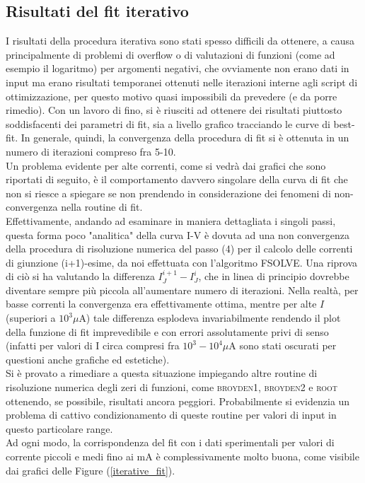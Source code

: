 \documentclass[10pt,letterpaper]{article}
\begin{document}
\subsection{Risultati del fit iterativo}
I risultati della procedura iterativa sono stati spesso difficili da ottenere, a causa principalmente di problemi di overflow o di valutazioni di funzioni (come ad esempio il logaritmo) per argomenti negativi, che ovviamente non erano dati in input ma erano risultati temporanei ottenuti nelle iterazioni interne agli script di ottimizzazione, per questo motivo quasi impossibili da prevedere (e da porre rimedio). Con un lavoro di fino, si è riusciti ad ottenere dei risultati piuttosto soddisfacenti dei parametri di fit, sia a livello grafico tracciando le curve di best-fit. In generale, quindi, la convergenza della procedura di fit si è ottenuta in un numero di iterazioni compreso fra 5-10.\\
Un problema evidente per alte correnti, come si vedrà dai grafici che sono riportati di seguito, è il comportamento davvero singolare della curva di fit che non si riesce a spiegare se non prendendo in considerazione dei fenomeni di non-convergenza nella routine di fit. \\
Effettivamente, andando ad esaminare in maniera dettagliata i singoli passi, questa forma poco "analitica" della curva I-V è dovuta ad una non convergenza della procedura di risoluzione numerica del passo (4) per il calcolo delle correnti di giunzione (i+1)-esime, da noi effettuata con l'algoritmo \textsc{FSOLVE}. Una riprova di ciò si ha valutando la differenza $I_{J}^{i+1} - I_{J}^{i}$, che in linea di principio dovrebbe diventare sempre più piccola all'aumentare numero di iterazioni. Nella realtà, per basse correnti la convergenza era effettivamente ottima, mentre per alte $I$ (superiori a $10^3 \mu$A) tale differenza esplodeva invariabilmente rendendo il plot della funzione di fit imprevedibile e con errori assolutamente privi di senso (infatti per valori di I circa compresi fra $10^3 - 10^4 \mu$A sono stati oscurati per questioni anche grafiche ed estetiche).\\
Si è provato a rimediare a questa situazione impiegando altre routine di risoluzione numerica degli zeri di funzioni, come \textsc{broyden1}, \textsc{broyden2} e \textsc{root} ottenendo, se possibile, risultati ancora peggiori. Probabilmente si evidenzia un problema di cattivo condizionamento di queste routine per valori di input in questo particolare range.\\
Ad ogni modo, la corrispondenza del fit con i dati sperimentali per valori di corrente piccoli e medi fino ai mA è complessivamente molto buona, come visibile dai grafici delle Figure (\ref{iterative_fit}).\\
\end{document}

